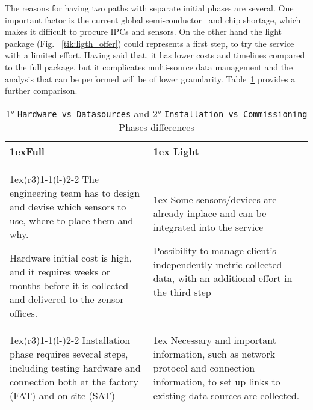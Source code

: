 The reasons for having two paths with separate initial phases are several. One important factor is the current global semi-conductor~\cite{Article:bbcnews_2021_chip} and chip shortage,
 which makes it difficult to procure \ac{IPCs} and sensors.
On the other hand the light package (Fig. ~\ref{tik:ligth_offer}) could represents a first step, to try the service with a limited effort.
Having said that, it has lower costs and timelines compared to the full package, but it complicates multi-source data management and the analysis that can be performed will be of lower granularity.
Table~\ref*{tab:phase_diff} provides a further comparison.
\begin{table}[h]
	\begin{tabularx}{\textwidth}{>{\parskip1ex}X@{\kern4\tabcolsep}>{\parskip1ex}X}
		\toprule
		\hfil\bfseries Full
		 &
		\hfil\bfseries Light
		\\\cmidrule(r{3\tabcolsep}){1-1}\cmidrule(l{-\tabcolsep}){2-2}
		The engineering team has to design and devise which sensors to use, where to place them and why.\par
		Hardware initial cost is high, and it requires weeks or months before it is collected and delivered to the zensor offices.\par
		 &
		Some sensors/devices are already inplace and can be integrated into the service\par
		Possibility to manage client's independently metric collected data, with an additional effort in the third step\par
		\\\cmidrule(r{3\tabcolsep}){1-1}\cmidrule(l{-\tabcolsep}){2-2}
		Installation phase requires several steps, including testing hardware and connection both at the factory (FAT) and on-site (SAT)\par
		 &
		Necessary and important information, such as network protocol and connection information, to set up links to existing data sources are collected.\par
		\\\bottomrule
	\end{tabularx}
	\caption{1° \texttt{Hardware vs Datasources} and 2° \texttt{Installation vs Commissioning} Phases differences}
	\label{tab:phase_diff}
\end{table}

